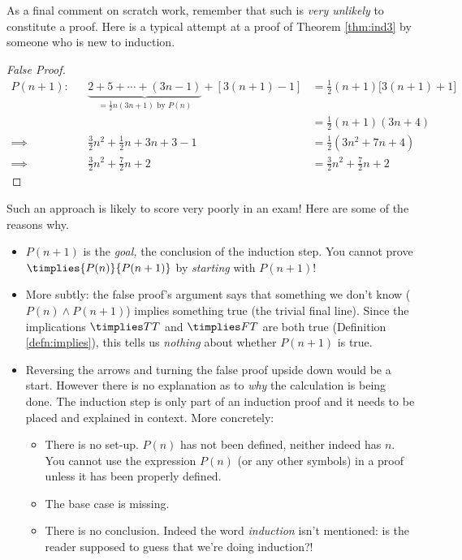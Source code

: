 As a final comment on scratch work, remember that such is \emph{very unlikely} to constitute a proof. Here is a typical attempt at a proof of Theorem \ref{thm:ind3} by someone who is new to induction.
\begin{proof}[False Proof]
\begin{align*}
P(n+1):&&\underbrace{2+5+\cdots+(3n-1)}_{=\frac 12n(3n+1)\text{ by }P(n)}+[3(n+1)-1]&=\frac 12(n+1)\bigl[3(n+1)+1\bigr]\phantom{osihasdhflzsjhfdk}\\[-15pt]
&&&=\frac 12(n+1)(3n+4)\\
\implies&&\frac 32n^2+\frac 12n+3n+3-1&=\frac 12(3n^2+7n+4)\\
\implies&&\frac 32n^2+\frac 72n+2&=\frac 32n^2+\frac 72n+2\tag*{\qedhere}
\end{align*}
\end{proof}

\noindent Such an approach is likely to score very poorly in an exam! Here are some of the reasons why.
\begin{itemize}
  \item $P(n+1)$ is the \emph{goal,} the conclusion of the induction step. You cannot prove $\timplies{P(n)}{P(n+1)}$ by \emph{starting} with $P(n+1)$!
  \item More subtly: the false proof's argument says that something we don't know ($P(n)\wedge P(n+1)$) implies something true (the trivial final line). Since the implications $\timplies TT$ and $\timplies FT$ are both true (Definition \ref{defn:implies}), this tells us \emph{nothing} about whether $P(n+1)$ is true.
  \item Reversing the arrows and turning the false proof upside down would be a start. However there is no explanation as to \emph{why} the calculation is being done. The induction step is only part of an induction proof and it needs to be placed and explained in context. More concretely:
  \begin{itemize}
    \item There is no set-up. $P(n)$ has not been defined, neither indeed has $n$. You cannot use the expression $P(n)$ (or any other symbols) in a proof unless it has been properly defined.
  	\item The base case is missing.
  	\item There is no conclusion. Indeed the word \emph{induction} isn't mentioned: is the reader supposed to guess that we're doing induction?!
	\end{itemize}
\end{itemize}

